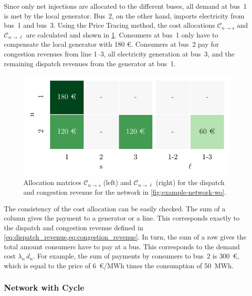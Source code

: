 \documentclass[11pt,twocolumn]{article}
\begin{document}
Since only net injections are allocated to the different buses, all demand at bus~1 is met by the local generator. Bus~2, on the other hand, imports electricity from bus~1 and bus~3. Using the Price Tracing method, the cost allocations $\mathcal{C}_{n\rightarrow s}$ and $\mathcal{C}_{n\rightarrow \ell}$ are calculated and shown in \cref{fig:example-network-payoff-wo}. Consumers at bus~1 only have to compensate the local generator with 180 \euro. Consumers at bus~2 pay for congestion revenues from line 1--3, all electricity generation at bus~3, and the remaining dispatch revenues from the generator at bus~1. 

\begin{figure}[h]
    \includegraphics[width=\linewidth]{example-without-cycles/payoff}
    \caption{Allocation matrices $\mathcal{C}_{n\rightarrow s}$ (left) and $\mathcal{C}_{n\rightarrow \ell}$ (right) for the dispatch and congestion revenue for the network in \cref{fig:example-network-wo}.}
    \label{fig:example-network-payoff-wo}
\end{figure}
 
The consistency of the cost allocation can be easily checked. The sum of a column gives the payment to a generator or a line. This corresponds exactly to the dispatch and congestion revenue defined in \cref{eq:dispatch_revenue,eq:congestion_revenue}. In turn, the sum of a row gives the total amount consumers have to pay at a bus. This corresponds to the demand cost $\lambda_n \, d_n$. For example, the sum of payments by consumers to bus~2 is 300~\euro, which is equal to the price of 6~\euro/MWh times the consumption of 50~MWh. \\


\subsubsection*{Network with Cycle}
\end{document}
